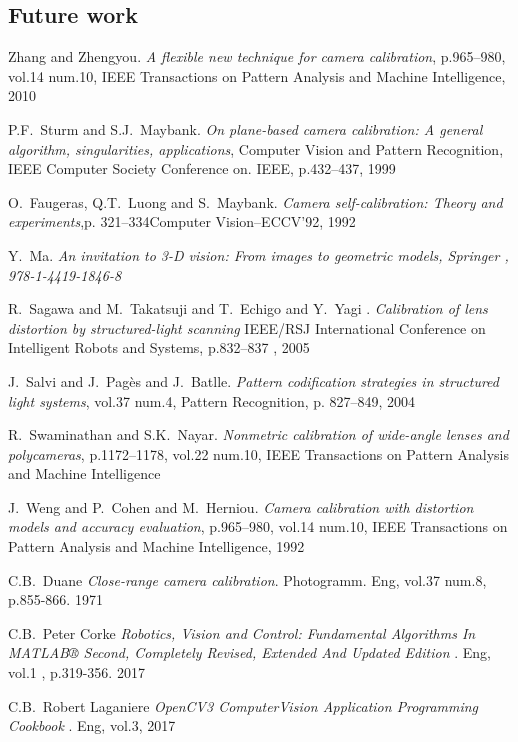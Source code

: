 \documentclass[journal,final,a4paper,twoside]{PS}
\begin{document}
\subsection{Future work}
\label{sec:future}

%

\begin{thebibliography}{1}
Zhang and Zhengyou. \emph{A flexible new technique for camera calibration}, p.965--980, vol.14 num.10, IEEE Transactions on Pattern Analysis and Machine Intelligence, 2010

P.F.~Sturm and S.J.~Maybank. \emph{On plane-based camera calibration: A general algorithm, singularities, applications}, Computer Vision and Pattern Recognition, IEEE Computer Society Conference on. IEEE, p.432--437, 1999

O.~Faugeras, Q.T.~Luong and S.~Maybank. \emph{Camera self-calibration: Theory and experiments},p. 321--334Computer Vision--ECCV'92, 1992

Y.~Ma. \emph{{An invitation to 3-D vision: From images to geometric models}, {Springer} , {978-1-4419-1846-8}}

R.~Sagawa and M.~Takatsuji and T.~Echigo and Y.~Yagi . \emph{Calibration of lens distortion by structured-light scanning} IEEE/RSJ International Conference on Intelligent Robots and Systems, p.832--837 , 2005

J.~Salvi and J.~Pag{\`e}s and J.~Batlle. \emph{Pattern codification strategies in structured light systems}, vol.37 num.4, Pattern Recognition, p. 827--849, 2004

R.~Swaminathan and S.K.~Nayar. \emph{Nonmetric calibration of wide-angle lenses and polycameras}, p.1172--1178, vol.22 num.10, IEEE Transactions on Pattern Analysis and Machine Intelligence

J.~Weng and P.~Cohen and M.~Herniou. \emph{Camera calibration with distortion models and accuracy evaluation}, p.965--980, vol.14 num.10, IEEE Transactions on Pattern Analysis and Machine Intelligence, 1992

C.B.~Duane  \emph{Close-range camera calibration}. Photogramm. Eng, vol.37 num.8, p.855-866. 1971

C.B.~Peter Corke  \emph{Robotics, Vision and Control: Fundamental Algorithms In MATLAB® Second, Completely Revised, Extended And Updated Edition }. Eng, vol.1 , p.319-356. 2017

C.B.~Robert Laganiere  \emph{OpenCV3 ComputerVision Application Programming Cookbook }. Eng, vol.3, 2017

\end{thebibliography}
\end{document}

